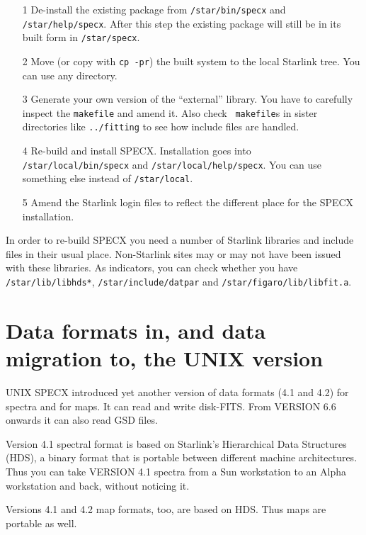 \documentclass[twoside,11pt]{article}
\newcommand{\xref}[3]{#1}
\newcommand{\xlabel}[1]{}
\renewcommand{\_}{\texttt{\symbol{95}}}
\begin{document}
\begin{itemize}
\item[1] De-install the existing package from {\tt /star/bin/specx} and
   {\tt /star/help/specx}. After this step the existing package will
   still be in its built form in {\tt /star/specx}.
\item[2] Move (or copy with {\tt cp -pr}) the built system to the local
   Starlink tree. You can use any directory.
\item[3] Generate your own version of the ``external'' library. You have
   to carefully inspect the {\tt makefile} and amend it. Also check {\tt
   makefile}s in sister directories like {\tt ../fitting} to see how
   include files are handled.
\item[4] Re-build and install SPECX. Installation goes into {\tt
   /star/local/bin/specx} and {\tt /star/\-local/help/specx}. You can use
   something else instead of {\tt /star/local}.
\item[5] Amend the Starlink login files to reflect the different place
   for the SPECX installation.
\end{itemize}

In order to re-build SPECX you need a number of Starlink libraries and
include files in their usual place. Non-Starlink sites may or may not
have been issued with these libraries. As indicators, you can check
whether you have {\tt /star/lib/libhds*}, {\tt /star/include/dat\_par}
and {\tt /star/figaro/lib/libfit.a}.


\section{\xlabel{data_formats_in_and_data_migration_to_the_unix_version}Data
formats in, and data migration to, the UNIX version}

UNIX SPECX introduced yet another version of data formats (4.1 and 4.2) for
spectra and for maps. It can read and write disk-FITS. From VERSION 6.6
onwards it can also read \xref{GSD}{sun229}{} files.

Version 4.1 spectral format is based on Starlink's Hierarchical Data
Structures (HDS), a binary format that is portable between different
machine architectures. Thus you can take VERSION 4.1 spectra from a Sun
workstation to an Alpha workstation and back, without noticing it.

Versions 4.1 and 4.2 map formats, too, are based on HDS. Thus maps are
portable as well.
\end{document}
